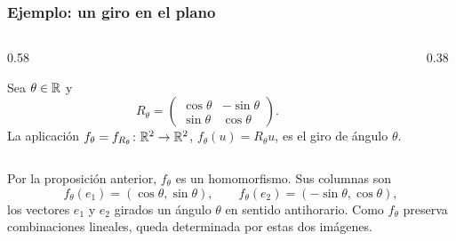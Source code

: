 \begin{frame}
    \frametitle{Ejemplo: un giro en el plano}

    \begin{columns}[T]
        \begin{column}{0.58\textwidth}
            \begin{example}
                Sea $\theta\in\mathbb{R}$ y
                \[
                    R_\theta=\begin{pmatrix}
                        \cos\theta&-\sin\theta\\
                        \sin\theta&\cos\theta
                    \end{pmatrix}.
                \]
                La aplicación $f_\theta=f_{R_\theta}\colon\mathbb{R}^2\to\mathbb{R}^2$,
                $f_\theta(u)=R_\theta u$, es el \alert{giro} de ángulo $\theta$.
            \end{example}
        \end{column}
        \begin{column}{0.38\textwidth}
            \centering
        \end{column}
    \end{columns}

    \medskip

    Por la proposición anterior, $f_\theta$ es un homomorfismo. Sus columnas
    son
    \[
        f_\theta(e_1)=(\cos\theta,\sin\theta),
        \qquad
        f_\theta(e_2)=(-\sin\theta,\cos\theta),
    \]
    los vectores $e_1$ y $e_2$ girados un ángulo $\theta$ en sentido
    antihorario. Como $f_\theta$ preserva combinaciones lineales, queda
    determinada por estas dos imágenes.
\end{frame}


